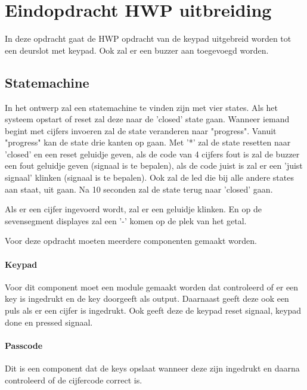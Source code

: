 \documentclass{article}
\begin{document}
  \section{Eindopdracht HWP uitbreiding}

  In deze opdracht gaat de HWP opdracht van de keypad uitgebreid worden tot een deurslot met keypad. Ook zal er een buzzer aan toegevoegd worden.


  \subsection{Statemachine}
    In het ontwerp zal een statemachine te vinden zijn met vier states. Als het systeem opstart of reset zal deze naar de 'closed' state gaan. Wanneer iemand begint met cijfers invoeren zal de state veranderen naar "progress". Vanuit "progress" kan de state drie kanten op gaan. Met '*' zal de state resetten naar 'closed' en een reset geluidje geven, als de code van 4 cijfers fout is zal de buzzer een fout geluidje geven (signaal is te bepalen), als de code juist is zal er een 'juist signaal' klinken (signaal is te bepalen). Ook zal de led die bij alle andere states aan staat, uit gaan. Na 10 seconden zal de state terug naar 'closed' gaan.

    Als er een cijfer ingevoerd wordt, zal er een geluidje klinken. En op de sevensegment displayes zal een '-' komen op de plek van het getal.

    Voor deze opdracht moeten meerdere componenten gemaakt worden.
    \paragraph{Keypad} Voor dit component moet een module gemaakt worden dat controleerd of er een key is ingedrukt en de key doorgeeft als output. Daarnaast geeft deze ook een puls als er een cijfer is ingedrukt. Ook geeft deze de keypad reset signaal, keypad done en pressed signaal.

    \paragraph{Passcode} Dit is een component dat de keys opslaat wanneer deze zijn ingedrukt en daarna controleerd of de cijfercode correct is.
\end{document}
